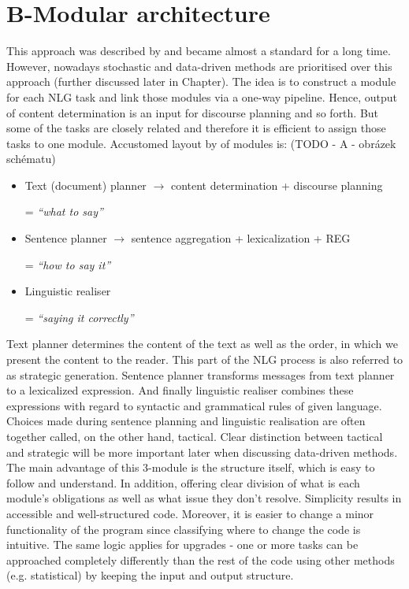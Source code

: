 \section{B-Modular architecture}
This approach was described by \cite{reiter1997building} and became almost a standard for a long time. However, nowadays stochastic and data-driven methods are prioritised over this approach (further discussed later in Chapter). The idea is to construct a module for each NLG task and link those modules via a one-way pipeline. Hence, output of content determination is an input for discourse planning and so forth. But some of the tasks are closely related and therefore it is efficient to assign those tasks to one module. Accustomed layout by \cite{reiter1997building} of modules is: (TODO - A - obrázek schématu)
\begin{itemize}
	\item Text (document) planner $\rightarrow$ content determination + discourse planning
	
	= \emph{“what to say”}
	\item Sentence planner $\rightarrow$ sentence aggregation + lexicalization + REG
	
	= \emph{“how to say it”}
	\item Linguistic realiser
	
	= \emph{“saying it correctly”}
\end{itemize}

Text planner determines the content of the text as well as the order, in which we present the content to the reader. This part of the NLG process is also referred to as strategic generation. Sentence planner transforms messages from text planner to a lexicalized expression. And finally linguistic realiser combines these expressions with regard to syntactic and grammatical rules of given language. Choices made during sentence planning and linguistic realisation are often together called, on the other hand, tactical. Clear distinction between tactical and strategic will be more important later when discussing data-driven methods.
The main advantage of this 3-module is the structure itself, which is easy to follow and understand. In addition, offering clear division of what is each module’s obligations as well as what issue they don’t resolve. Simplicity results in accessible and well-structured code. Moreover, it is easier to change a minor functionality of the program since classifying where to change the code is intuitive. The same logic applies for upgrades - one or more tasks can be approached completely differently than the rest of the code using other methods (e.g. statistical) by keeping the input and output structure.

